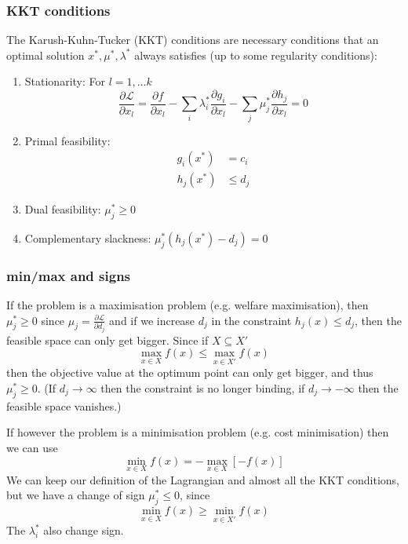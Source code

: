 \documentclass[10pt,aspectratio=169,dvipsnames]{beamer}
\def\l{\lambda}
\def\m{\mu}
\def\d{\partial}
\def\cL{\mathcal{L}}
\let\olditem\item
\renewcommand{\item}{%
\olditem\vspace{5pt}}
\begin{document}
\begin{frame}
  \frametitle{KKT conditions}

The \alert{Karush-Kuhn-Tucker (KKT) conditions} are necessary conditions that an optimal solution $x^*,\m^*,\l^*$ always satisfies (up to some regularity conditions):
\begin{enumerate}
\item \alert{Stationarity}: For $l = 1,\dots k$
  \begin{equation*}
  \frac{\d \cL}{\d x_l} =   \frac{\d f}{\d x_l} - \sum_i \l_i^* \frac{\d g_i}{\d x_l}  - \sum_j \m_j^* \frac{\d h_j}{\d x_l} = 0
  \end{equation*}
    \item \alert{Primal feasibility}:
      \begin{align*}
        g_i(x^*) & = c_i \\
        h_j(x^*) &\leq d_j
      \end{align*}
    \item \alert{Dual feasibility}: $\m_j^* \geq 0$
    \item \alert{Complementary slackness}: $\m_j^* (h_j(x^*) - d_j) = 0$
\end{enumerate}

\end{frame}

\begin{frame}
  \frametitle{min/max and signs}

  If the problem is a \alert{maximisation} problem (e.g. welfare maximisation), then
  \alert{$\m_j^* \geq 0$} since $\m_j = \frac{\d \cL}{\d d_j}$ and if we
  increase $d_j$ in the constraint $h_j(x) \leq d_j$, then the
  feasible space can only get bigger. Since if $X \subseteq X'$
  \begin{equation*}
 \max_{x\in X} f(x ) \leq     \max_{x\in X'} f(x)
  \end{equation*}
  then the objective value at the optimum point can only get bigger, and thus $\m_j^* \geq 0$. (If $d_j \to \infty$
  then the constraint is no longer binding, if $d_j \to -\infty$ then
  the feasible space vanishes.)

  If however the problem is a \alert{minimisation} problem (e.g. cost minimisation) then we can use
  \begin{equation*}
      \min_{x\in X} f(x) = - \max_{x\in X} \left[ -f(x)\right]
  \end{equation*}
  We can keep our definition of the Lagrangian and almost all the KKT
  conditions, but we have a change of sign \alert{$\m_j^* \leq 0$}, since
  \begin{equation*}
   \min_{x\in X} f(x ) \geq     \min_{x\in X'} f(x)
  \end{equation*}
  The $\l_i^*$ also change sign.

\end{frame}
\end{document}
